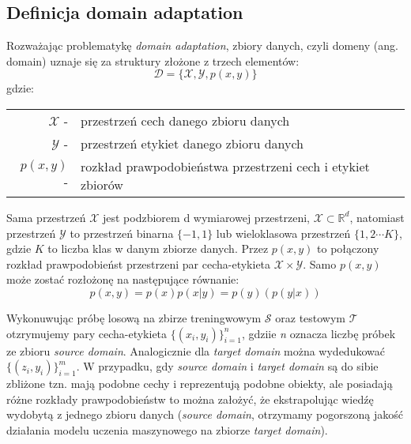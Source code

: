         \subsection{Definicja domain adaptation}
            Rozważając problematykę \textit{domain adaptation}, zbiory danych, czyli domeny (ang. domain) uznaje się za struktury złożone z trzech elementów:
            \begin{equation*}
                \mathcal{D} = \{\mathcal{X},\mathcal{Y},p(x,y)\}
            \end{equation*}
            gdzie:
            
            \begin{tabular}{rl}
                $\mathcal{X}$ -& przestrzeń cech danego zbioru danych \\
                $\mathcal{Y}$ -& przestrzeń etykiet danego zbioru danych \\
                $p(x,y)$ -& rozkład prawpodobieństwa przestrzeni cech i etykiet zbiorów
            \end{tabular}
            \linebreak
            
            Sama przestrzeń $\mathcal{X}$ jest podzbiorem d wymiarowej przestrzeni, $\mathcal{X} \subset \mathbb{R}^{d}$, natomiast przestrzeń $\mathcal{Y}$ to przestrzeń binarna $\{ -1, 1\}$ lub wieloklasowa przestrzeń $\{1,2\cdots K \}$, gdzie $K$ to liczba klas w danym zbiorze danych. Przez $p(x,y)$ to połączony rozkład prawpodobieńst przestrzeni par cecha-etykieta $\mathcal{X} \times \mathcal{Y}$. Samo $p(x,y)$ może zostać rozłożonę na następujące równanie:
            \begin{equation*}
                p(x,y) = p(x)p(x|y) = p(y)(p(y|x))
            \end{equation*}
            \par
            Wykonuwując próbę losową na zbirze treningwowym $\mathcal{S}$ oraz testowym $\mathcal{T}$ otzrymujemy pary cecha-etykieta
            $\{(x_i, y_i)\}^{n}_{i=1}$, gdziie \textit{n} oznacza liczbę próbek ze zbioru \textit{source domain}. Analogicznie dla \textit{target domain} można wydedukować $\{(z_i, y_i)\}^{m}_{i=1}$. W przypadku, gdy \textit{source domain} i \textit{target domain} są do sibie zbliżone tzn. mają podobne cechy i reprezentują podobne obiekty, ale posiadają różne rozkłady prawpodobieństw to można założyć, że ekstrapolując wiedźę wydobytą z jednego zbioru danych (\textit{source domain}, otrzymamy pogorszoną jakość działania modelu uczenia maszynowego na zbiorze \textit{target domain}). 
